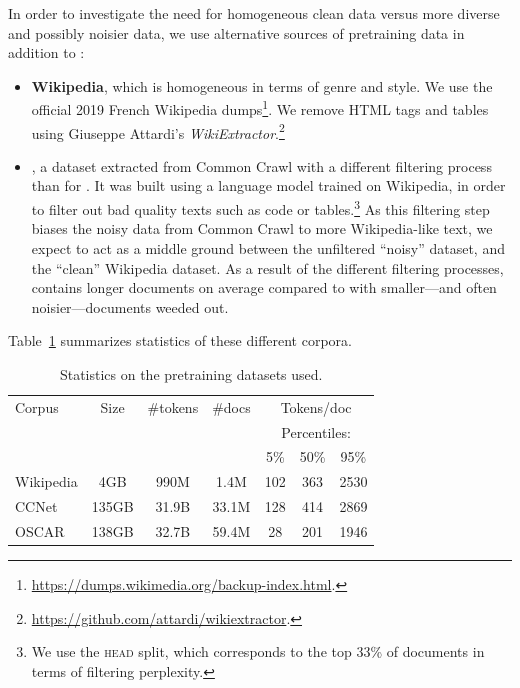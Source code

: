 In order to investigate the need for homogeneous clean data versus more diverse and possibly noisier data, we use alternative sources of pretraining data in addition to \oscar:
\begin{itemize}
    \item \textbf{Wikipedia}, which is homogeneous in terms of genre and style. We use the official 2019 French Wikipedia dumps\footnote{ \url{https://dumps.wikimedia.org/backup-index.html}.}. We remove HTML tags and tables using Giuseppe Attardi's  \emph{WikiExtractor}.\footnote{ \url{https://github.com/attardi/wikiextractor}.}
    \item \textbf{\ccnet} \cite{wenzek-etal-2020-ccnet}, a dataset extracted from Common Crawl with a different filtering process than for \oscar. It was built using a language model trained on Wikipedia, in order to filter out bad quality texts such as code or tables.\footnote{We use the \textsc{head} split, which corresponds to the top 33\% of documents in terms of filtering perplexity.} As this filtering step biases the noisy data from Common Crawl to more Wikipedia-like text, we expect \ccnet to act as a middle ground between the unfiltered ``noisy'' \oscar dataset, and the ``clean'' Wikipedia dataset. As a result of the different filtering processes, \ccnet contains longer documents on average compared to \oscar with smaller---and often noisier---documents weeded out.
\end{itemize}
Table~\ref{table:corpora_statistics} summarizes statistics of these different corpora.

\begin{table}[ht]
    \centering\small
        \begin{tabular}{lcccccc}
            \toprule
            Corpus    & Size  & \#tokens & \#docs & \multicolumn{3}{c}{Tokens/doc}                 \\
                      &       &          &        & \multicolumn{3}{c}{Percentiles:}               \\
                      &       &          &        & 5\%                              & 50\% & 95\% \\
            \midrule
            Wikipedia & 4GB   & 990M     & 1.4M   & 102                              & 363  & 2530 \\
            CCNet     & 135GB & 31.9B    & 33.1M  & 128                              & 414  & 2869 \\
            OSCAR     & 138GB & 32.7B    & 59.4M  & 28                               & 201  & 1946 \\
            \bottomrule
        \end{tabular}
    \caption{Statistics on the pretraining datasets used.}
    \label{table:corpora_statistics}
\end{table}

